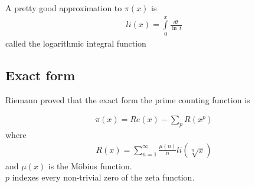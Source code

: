 \documentclass[a4paper]{article}
\begin{document}
A pretty good approximation to \(\pi(x)\) is
\begin{align*}
    li(x)=\int\limits_0^{x} \frac{dt}{\ln\,t}
\end{align*}
called the logarithmic integral function

\subsection{Exact form}

Riemann proved that the exact form the prime counting function is

\begin{align*}
    \pi(x)=Re(x)-\sum_{p}R(x^p)
\end{align*}
where
\begin{align*}
    R(x)=\sum_{n=1}^{\infty}\frac{\mu(n)}{n}li(\sqrt[n]{x})
\end{align*}
and \(\mu(x)\) is the Möbius function.\\
\(p\) indexes every non-trivial zero of the zeta function.
\end{document}
